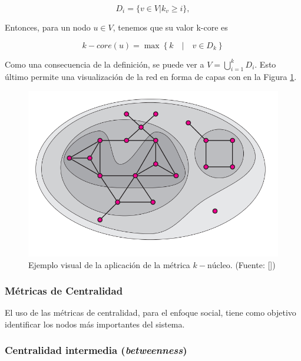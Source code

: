 \documentclass[../main.tex]{subfiles}
\begin{document}
\begin{equation}
    \label{marcoteorico_k-core_d_i}
    D_{i} = \{ v \in V | k_v \geq i \},
\end{equation}

Entonces, para un nodo $u \in V$, tenemos que su valor k-core es

\begin{equation}
    \label{marcoteorico_k-core_general}
    k-core(u) = \max \left\{ k \quad | \quad v \in D_k \right\}
\end{equation}

Como una consecuencia de la definición, se puede ver a $V = \bigcup_{i=1}^{k} D_i $. Esto último permite una visualización de la red en forma de capas con en la Figura \ref{fig:marco_teorico_kcore}.



\begin{figure}[h!]
    \centering
    \includegraphics[scale = 0.5]{images/marcoteorico_kcore.png}
    \caption{Ejemplo visual de la aplicación de la métrica $k-\text{núcleo}$.
    (Fuente:  [\cite{DBLP:journals/corr/cs-DS-0310049}])}
    \label{fig:marco_teorico_kcore}
\end{figure}


\subsubsection{Métricas de Centralidad} 

El uso de las métricas de centralidad, para el enfoque social, tiene como objetivo identificar los nodos más importantes del sistema.
 
\subsubsection{Centralidad intermedia  (\textit{betweenness}) }
\end{document}
